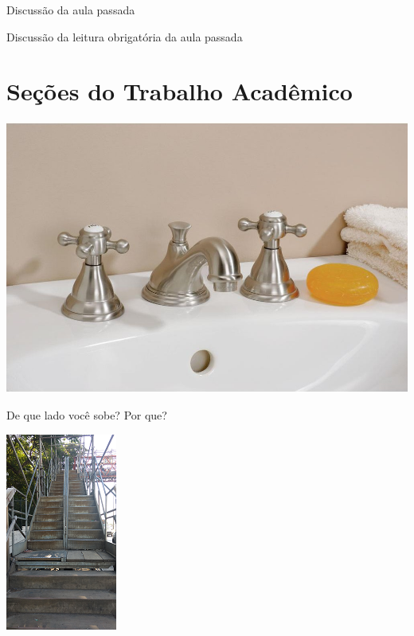 \documentclass{beamer}
\begin{document}

\begin{frame}{Discussão da aula passada}
  \begin{block}{}
    Discussão da leitura obrigatória da aula passada
  \end{block}
\end{frame}

\section{Seções do Trabalho Acadêmico}


\begin{frame}
  \begin{center}
    \includegraphics[height=.8\textheight]{EstruturaI/torneira}


  \end{center}
\end{frame}

\begin{frame}{De que lado você sobe? Por que?}
  \begin{center}
    \includegraphics[height=\textheight]{EstruturaI/escada}
  \end{center}
\end{frame}
\end{document}
